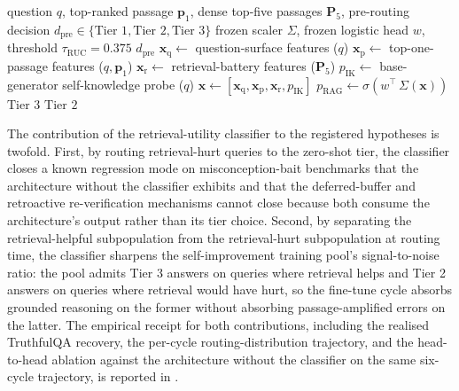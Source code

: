 \begin{algorithm}[!htbp]
\caption[Retrieval-utility classifier scoring and dispatch refinement.]{Retrieval-utility classifier scoring and dispatch refinement.}
\label{alg:ruc}
\begin{algorithmic}[1]
\Require question $q$, top-ranked passage $\mathbf{p}_{1}$, dense top-five passages $\mathbf{P}_{5}$, pre-routing decision $d_{\text{pre}} \in \{\text{Tier 1}, \text{Tier 2}, \text{Tier 3}\}$
\Require frozen scaler $\Sigma$, frozen logistic head $w$, threshold $\tau_{\text{RUC}} = 0.375$
    \State \Return $d_{\text{pre}}$ 
\EndIf
\State $\mathbf{x}_{\text{q}} \gets$ question-surface features ($q$) 
\State $\mathbf{x}_{\text{p}} \gets$ top-one-passage features ($q, \mathbf{p}_{1}$) 
\State $\mathbf{x}_{\text{r}} \gets$ retrieval-battery features ($\mathbf{P}_{5}$) 
\State $p_{\text{IK}} \gets$ base-generator self-knowledge probe ($q$) 
\State $\mathbf{x} \gets [\mathbf{x}_{\text{q}}, \mathbf{x}_{\text{p}}, \mathbf{x}_{\text{r}}, p_{\text{IK}}]$
\State $p_{\text{RAG}} \gets \sigma\!\left(w^{\top}\, \Sigma(\mathbf{x})\right)$ 
    \State \Return $\text{Tier 3}$ 
\Else
    \State \Return $\text{Tier 2}$ 
\EndIf
\end{algorithmic}
\end{algorithm}

The contribution of the retrieval-utility classifier to the registered hypotheses is twofold. First, by routing retrieval-hurt queries to the zero-shot tier, the classifier closes a known regression mode on misconception-bait benchmarks that the architecture without the classifier exhibits and that the deferred-buffer and retroactive re-verification mechanisms cannot close because both consume the architecture's output rather than its tier choice. Second, by separating the retrieval-helpful subpopulation from the retrieval-hurt subpopulation at routing time, the classifier sharpens the self-improvement training pool's signal-to-noise ratio: the pool admits Tier 3 answers on queries where retrieval helps and Tier 2 answers on queries where retrieval would have hurt, so the fine-tune cycle absorbs grounded reasoning on the former without absorbing passage-amplified errors on the latter. The empirical receipt for both contributions, including the realised TruthfulQA recovery, the per-cycle routing-distribution trajectory, and the head-to-head ablation against the architecture without the classifier on the same six-cycle trajectory, is reported in .


